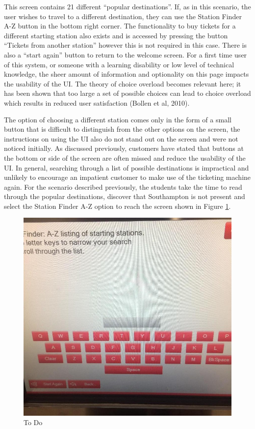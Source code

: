 This screen contains 21 different “popular destinations”. If, as in this scenario, the user wishes to travel to a different destination, they can use the Station Finder A-Z button in the bottom right corner. The functionality to buy tickets for a different starting station also exists and is accessed by pressing the button “Tickets from another station” however this is not required in this case. There is also a “start again” button to return to the welcome screen. For a first time user of this system, or someone with a learning disability or low level of technical knowledge, the sheer amount of information and optionality on this page impacts the usability of the UI. The theory of choice overload becomes relevant here; it has been shown that too large a set of possible choices can lead to choice overload which results in reduced user satisfaction (Bollen et al, 2010).

The option of choosing a different station comes only in the form of a small button that is difficult to distinguish from the other options on the screen, the instructions on using the UI also do not stand out on the screen and were not noticed initially. As discussed previously, customers have stated that buttons at the bottom or side of the screen are often missed and reduce the usability of the UI.  In general, searching through a list of possible destinations is impractical and unlikely to encourage an impatient customer to make use of the ticketing machine again. For the scenario described previously, the students take the time to read through the popular destinations, discover that Southampton is not present and select the Station Finder A-Z option to reach the screen shown in Figure \ref{fig:keyboard}. 

\begin{figure}[h]
	\centering
	\includegraphics[width=0.5\linewidth, angle=0, origin=c]{images/image04}
	\caption{To Do}
	\label{fig:keyboard}
\end{figure}

